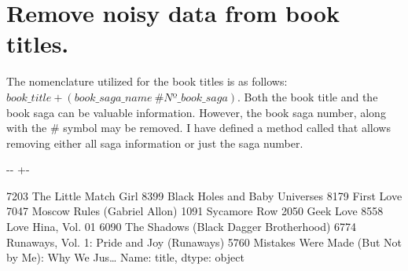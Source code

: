 \documentclass[letterpaper,10pt,english]{sphinxmanual}
\newlength\nbsphinxcodecellspacing
\begin{document}
\section{Remove noisy data from book titles.}
\label{\detokenize{Data preprocessing:Remove-noisy-data-from-book-titles.}}
The nomenclature utilized for the book titles is as follows: \(book\_title + (book\_saga\_name \ \#Nº\_book\_saga)\). Both the book title and the book saga can be valuable information. However, the book saga number, along with the \# symbol may be removed. I have defined a method called  that allows removing either all saga information or just the saga number.

{
\begin{sphinxVerbatim}[commandchars=\\\{\}]
\llap{\color{nbsphinxin}[21]:\,\hspace{\fboxrule}\hspace{\fboxsep}}  \PYG{p}{[}    \PYG{p}{]}
 
\end{sphinxVerbatim}
}

{

\kern-\sphinxverbatimsmallskipamount\kern-\baselineskip
\kern+\FrameHeightAdjust\kern-\fboxrule
\vspace{\nbsphinxcodecellspacing}

\begin{sphinxVerbatim}[commandchars=\\\{\}]
\llap{\color{nbsphinxout}[21]:\,\hspace{\fboxrule}\hspace{\fboxsep}}7203                                The Little Match Girl
8399                       Black Holes and Baby Universes
8179                                           First Love
7047                         Moscow Rules (Gabriel Allon)
1091                                         Sycamore Row
2050                                            Geek Love
8558                                   Love Hina, Vol. 01
6090               The Shadows (Black Dagger Brotherhood)
6774           Runaways, Vol. 1: Pride and Joy (Runaways)
5760    Mistakes Were Made (But Not by Me): Why We Jus{\ldots}
Name: title, dtype: object
\end{sphinxVerbatim}
}
\end{document}
